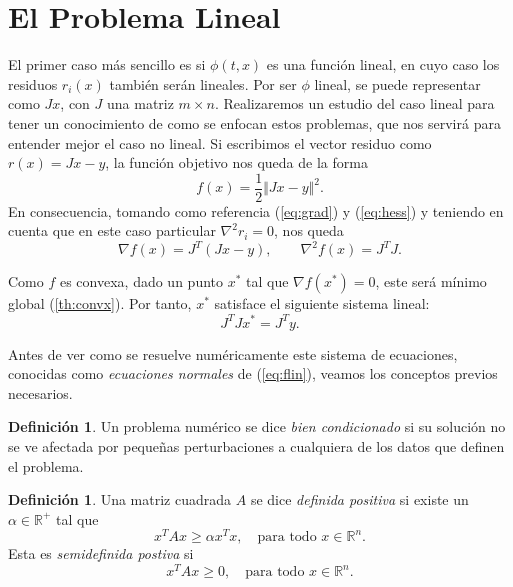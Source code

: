 \documentclass[11pt,a4paper]{book}
\theoremstyle{definition}
\newtheorem{definition}[theorem]{Definición}
\theoremstyle{remark}
\begin{document}
\section{El Problema Lineal}

El primer caso más sencillo es si $\phi (t, x)$ es una función lineal, en cuyo caso los residuos
$r_i(x)$ también serán lineales.
Por ser $\phi$ lineal, se puede representar como $Jx$, con $J$ una matriz
$m\times n$.
Realizaremos un estudio del caso lineal para tener un conocimiento de como se enfocan estos problemas, que nos servirá para entender mejor el caso no lineal.
Si escribimos el vector residuo como $r(x) = Jx-y$, la función objetivo nos queda de la forma
\begin{equation}
	f(x) = \frac{1}{2} \Vert Jx-y \Vert^2.
	\label{eq:flin}
\end{equation}
En consecuencia, tomando como referencia (\ref{eq:grad}) y (\ref{eq:hess}) y teniendo en cuenta que en este caso particular $\nabla^2r_i=0$, nos queda
\begin{equation}
	\nabla f(x) = J^T(Jx-y), \qquad \nabla^2 f(x) =  J^TJ.
\end{equation}

Como $f$ es convexa, dado un punto $x^*$ tal que $\nabla f(x^*) = 0$, este será mínimo global (\ref{th:convx}). Por tanto, $x^*$ satisface el siguiente sistema lineal:
\begin{equation}
	J^TJx^* = J^Ty.
\end{equation}

Antes de ver como se resuelve numéricamente este sistema de ecuaciones, conocidas como \textit{ecuaciones normales} de (\ref{eq:flin}), veamos los conceptos previos necesarios.

\begin{definition}
	Un problema numérico se dice \textit{bien condicionado} si su solución no se ve afectada por pequeñas perturbaciones a cualquiera de los datos que definen el problema.
\end{definition}

\begin{definition}
	Una matriz cuadrada $A$ se dice \textit{definida positiva} si existe un $\alpha \in \mathbb{R}^+$ tal que
	\begin{equation}
		x^TAx \geq \alpha x^T x, \quad \text{para todo } x \in \mathbb{R}^n.
	\end{equation}
	Esta es \textit{semidefinida postiva} si
	\begin{equation}
		x^TAx \geq 0, \quad \text{para todo } x \in \mathbb{R}^n.
	\end{equation}
\end{definition}
\end{document}
